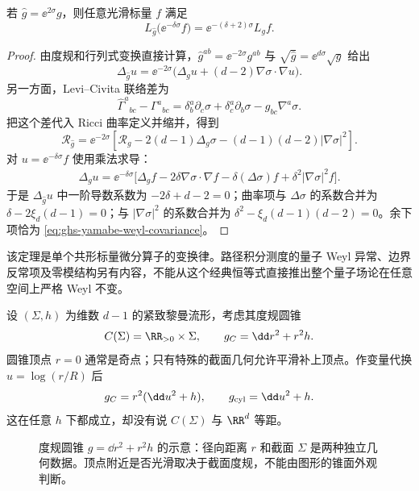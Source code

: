 \begin{theorem}[共形 拉普拉斯算子的协变性]
\label{thm:ghs-yamabe-covariance}
若 $\widehat g=\ee^{2\sigma}g$，则任意光滑标量 $f$ 满足
\begin{equation}\label{eq:ghs-yamabe-weyl-covariance}
 L_{\widehat g}\bigl(\ee^{-\delta\sigma}f\bigr)
 =\ee^{-(\delta+2)\sigma}L_g f.
\end{equation}
\end{theorem}
\begin{proof}
由度规和行列式变换直接计算，$\widehat g^{ab}=\ee^{-2\sigma}g^{ab}$ 与 $\sqrt{\widehat g}=\ee^{d\sigma}\sqrt g$ 给出
\[
 \Delta_{\widehat g}u=\ee^{-2\sigma}
 \bigl(\Delta_g u+(d-2)\nabla\sigma\cdot\nabla u\bigr).
\]
另一方面，Levi--Civita 联络差为
\[
 \widehat\Gamma^a{}_{bc}-\Gamma^a{}_{bc}
 =\delta^a_b\partial_c\sigma+\delta^a_c\partial_b\sigma-g_{bc}\nabla^a\sigma.
\]
把这个差代入 Ricci 曲率定义并缩并，得到
\[
 \mathcal R_{\widehat g}=\ee^{-2\sigma}
 \left[\mathcal R_g-2(d-1)\Delta_g\sigma-(d-1)(d-2)|\nabla\sigma|^2\right].
\]
对 $u=\ee^{-\delta\sigma}f$ 使用乘法求导：
\begin{align*}
\Delta_gu=\ee^{-\delta\sigma}\bigl[\Delta_gf
 -2\delta\nabla\sigma\cdot\nabla f
 -\delta(\Delta\sigma)f+\delta^2|\nabla\sigma|^2f\bigr].
\end{align*}
于是 $\Delta_{\widehat g}u$ 中一阶导数系数为 $-2\delta+d-2=0$；曲率项与 $\Delta\sigma$ 的系数合并为 $\delta-2\xi_d(d-1)=0$；与 $|\nabla\sigma|^2$ 的系数合并为 $\delta^2-\xi_d(d-1)(d-2)=0$。余下项恰为 \cref{eq:ghs-yamabe-weyl-covariance}。
\end{proof}

该定理是单个共形标量微分算子的变换律。路径积分测度的量子 Weyl 异常、边界反常项及零模结构另有内容，不能从这个经典恒等式直接推出整个量子场论在任意空间上严格 Weyl 不变。

设 $(\Sigma,h)$ 为维数 $d-1$ 的紧致黎曼流形，考虑其度规圆锥
\begin{equation}\label{eq:ghs-metric-cone}
 C(\Sigma)=\RR_{>0}\times\Sigma,
 \qquad g_C=\dd r^2+r^2h.
\end{equation}
圆锥顶点 $r=0$ 通常是奇点；只有特殊的截面几何允许平滑补上顶点。作变量代换 $u=\log(r/R)$ 后
\[
 g_C=r^2(\dd u^2+h),\qquad g_{\rm cyl}=\dd u^2+h.
\]
这在任意 $h$ 下都成立，却没有说 $C(\Sigma)$ 与 $\RR^d$ 等距。

\begin{figure}[htbp]
\centering

\caption{度规圆锥 $g=\dd r^2+r^2h$ 的示意：径向距离 $r$ 和截面 $\Sigma$ 是两种独立几何数据。顶点附近是否光滑取决于截面度规，不能由图形的锥面外观判断。}\label{fig:ghs-metric-cone}
\end{figure}

